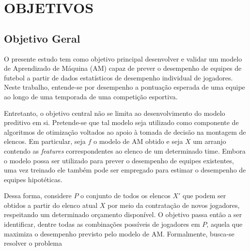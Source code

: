 \chapter{OBJETIVOS}

\section{Objetivo Geral}

O presente estudo tem como objetivo principal desenvolver e validar um 
modelo de Aprendizado de Máquina (AM) capaz de prever o desempenho de 
equipes de futebol a partir de dados estatísticos de desempenho individual 
de jogadores. Neste trabalho, entende-se por desempenho a pontuação esperada 
de uma equipe ao longo de uma temporada de uma competição esportiva.

Entretanto, o objetivo central não se limita ao desenvolvimento 
do modelo preditivo em si. Pretende-se que tal modelo seja utilizado 
como componente de algoritmos de otimização voltados ao apoio à 
tomada de decisão na montagem de elencos. Em particular, seja $f$ o 
modelo de AM obtido e seja $X$ um arranjo contendo as \textit{features} 
correspondentes ao elenco de um determinado time. Embora o modelo possa 
ser utilizado para prever o desempenho de equipes existentes, uma vez 
treinado ele também pode ser empregado para estimar o desempenho de 
equipes hipotéticas.

Dessa forma, considere $P$ o conjunto de todos os elencos $X'$ que 
podem ser obtidos a partir do elenco atual $X$ por meio da contratação 
de novos jogadores, respeitando um determinado orçamento disponível. 
O objetivo passa então a ser identificar, dentre todas as combinações 
possíveis de jogadores em $P$, aquela que maximiza o desempenho 
previsto pelo modelo de AM. Formalmente, busca-se resolver o problema

